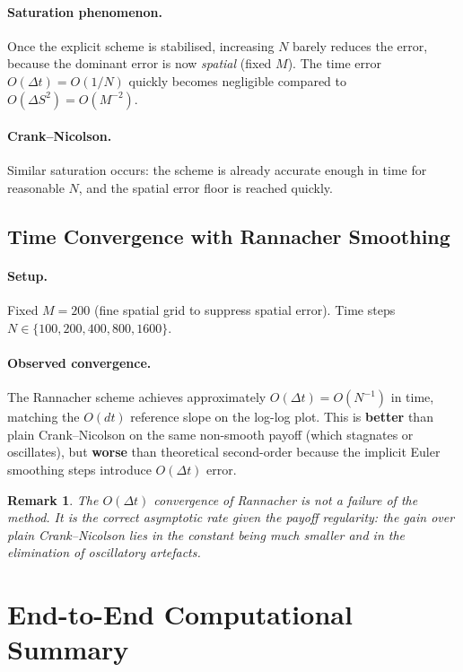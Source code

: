 \documentclass[12pt, a4paper]{article}
\newtheorem{remark}{Remark}[section]
\begin{document}
\paragraph{Saturation phenomenon.} Once the explicit scheme is stabilised,
increasing $N$ barely reduces the error, because the dominant error is now
\emph{spatial} (fixed $M$). The time error $O(\Delta t) = O(1/N)$ quickly
becomes negligible compared to $O(\Delta S^2) = O(M^{-2})$.

\paragraph{Crank--Nicolson.} Similar saturation occurs: the scheme is already
accurate enough in time for reasonable $N$, and the spatial error floor is
reached quickly.

\subsection{Time Convergence with Rannacher Smoothing}

\paragraph{Setup.} Fixed $M = 200$ (fine spatial grid to suppress spatial
error). Time steps $N \in \{100, 200, 400, 800, 1600\}$.

\paragraph{Observed convergence.} The Rannacher scheme achieves approximately
$O(\Delta t) = O(N^{-1})$ in time, matching the $O(dt)$ reference slope on the
log-log plot. This is \textbf{better} than plain Crank--Nicolson on the same
non-smooth payoff (which stagnates or oscillates), but \textbf{worse} than
theoretical second-order because the implicit Euler smoothing steps introduce
$O(\Delta t)$ error.

\begin{remark}
    The $O(\Delta t)$ convergence of Rannacher is not a failure of the method.
    It is the \emph{correct} asymptotic rate given the payoff regularity: the
    gain over plain Crank--Nicolson lies in the \emph{constant} being much
    smaller and in the elimination of oscillatory artefacts.
\end{remark}

\section{End-to-End Computational Summary}
\end{document}
